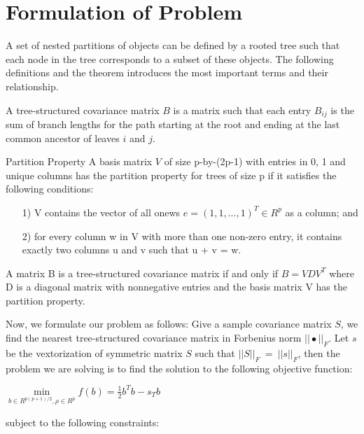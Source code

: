 \section{Formulation of Problem}

A set of nested partitions of objects can be defined by a rooted tree such that each node in the tree corresponds to a subset of these objects. The following definitions and the theorem introduces the most important terms and their relationship.

\begin{definition}
A tree-structured covariance matrix $B$ is a matrix such that each entry $B_{ij}$ is the sum of branch lengths for the path starting at the root and ending at the last common ancestor of leaves $i$ and $j$.
\end{definition}

\begin{definition}{Partition Property}
A basis matrix $V$ of size p-by-(2p-1) with entries in {0, 1} and unique columns has the partition property for trees of size p if it satisfies the following conditions:
\begin{itemize}
\item[1)] V contains the vector of all onews $e = (1, 1, ..., 1)^T \in R^p$ as a column; and
\item[2)] for every column w in V with more than one non-zero entry, it contains exactly two columns u and v such that u + v = w.
\end{itemize}
\end{definition}

\begin{theorem}
A matrix B is a tree-structured covariance matrix if and only if $B=VDV^T$ where D is a diagonal matrix with nonnegative entries and the basis matrix V has the partition property.
\end{theorem}

Now, we formulate our problem as follows:
Give a sample covariance matrix $S$, we find the nearest tree-structured covariance matrix in Forbenius norm $|| \bullet ||_F$. Let $s$ be the vextorization of symmetric matrix $S$ such that $||S||_F~=~||s||_F$, then the problem we are solving is to find the solution to the following objective function:

$\min \limits_{b \in R^{p(p+1)/2}, \rho \in R^{\overline{p}}} f(b) = \frac{1}{2}b^Tb - s_Tb$

subject to the following constraints:

